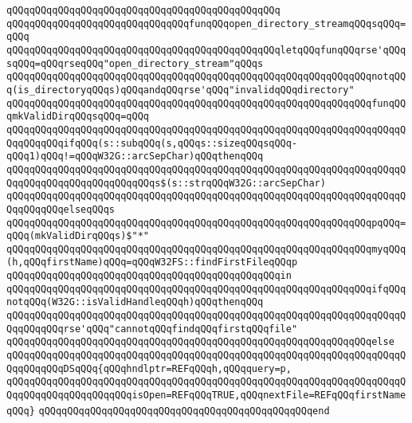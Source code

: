 \verb|qQQqqQQqqQQqqQQqqQQqqQQqqQQqqQQqqQQqqQQqqQQqqQQq|\newline
\verb|qQQqqQQqqQQqqQQqqQQqqQQqqQQqqQQqfunqQQqopen_directory_streamqQQqsqQQq=qQQq|\newline
\verb|qQQqqQQqqQQqqQQqqQQqqQQqqQQqqQQqqQQqqQQqqQQqqQQqletqQQqfunqQQqrse'qQQqsqQQq=qQQqrseqQQq"open_directory_stream"qQQqs|\newline
\verb|qQQqqQQqqQQqqQQqqQQqqQQqqQQqqQQqqQQqqQQqqQQqqQQqqQQqqQQqqQQqqQQqnotqQQq(is_directoryqQQqs)qQQqandqQQqrse'qQQq"invalidqQQqdirectory"|\newline
\verb|qQQqqQQqqQQqqQQqqQQqqQQqqQQqqQQqqQQqqQQqqQQqqQQqqQQqqQQqqQQqqQQqfunqQQqmkValidDirqQQqsqQQq=qQQq|\newline
\verb|qQQqqQQqqQQqqQQqqQQqqQQqqQQqqQQqqQQqqQQqqQQqqQQqqQQqqQQqqQQqqQQqqQQqqQQqqQQqqQQqifqQQq(s::subqQQq(s,qQQqs::sizeqQQqsqQQq-qQQq1)qQQq!=qQQqW32G::arcSepChar)qQQqthenqQQq|\newline
\verb|qQQqqQQqqQQqqQQqqQQqqQQqqQQqqQQqqQQqqQQqqQQqqQQqqQQqqQQqqQQqqQQqqQQqqQQqqQQqqQQqqQQqqQQqqQQqqQQqs$(s::strqQQqW32G::arcSepChar)|\newline
\verb|qQQqqQQqqQQqqQQqqQQqqQQqqQQqqQQqqQQqqQQqqQQqqQQqqQQqqQQqqQQqqQQqqQQqqQQqqQQqqQQqelseqQQqs|\newline
\verb|qQQqqQQqqQQqqQQqqQQqqQQqqQQqqQQqqQQqqQQqqQQqqQQqqQQqqQQqqQQqqQQqpqQQq=qQQq(mkValidDirqQQqs)$"*"|\newline
\verb|qQQqqQQqqQQqqQQqqQQqqQQqqQQqqQQqqQQqqQQqqQQqqQQqqQQqqQQqqQQqqQQqmyqQQq(h,qQQqfirstName)qQQq=qQQqW32FS::findFirstFileqQQqp|\newline
\verb|qQQqqQQqqQQqqQQqqQQqqQQqqQQqqQQqqQQqqQQqqQQqqQQqin|\newline
\verb|qQQqqQQqqQQqqQQqqQQqqQQqqQQqqQQqqQQqqQQqqQQqqQQqqQQqqQQqqQQqqQQqifqQQqnotqQQq(W32G::isValidHandleqQQqh)qQQqthenqQQq|\newline
\verb|qQQqqQQqqQQqqQQqqQQqqQQqqQQqqQQqqQQqqQQqqQQqqQQqqQQqqQQqqQQqqQQqqQQqqQQqqQQqqQQqrse'qQQq"cannotqQQqfindqQQqfirstqQQqfile"|\newline
\verb|qQQqqQQqqQQqqQQqqQQqqQQqqQQqqQQqqQQqqQQqqQQqqQQqqQQqqQQqqQQqqQQqelse|\newline
\verb|qQQqqQQqqQQqqQQqqQQqqQQqqQQqqQQqqQQqqQQqqQQqqQQqqQQqqQQqqQQqqQQqqQQqqQQqqQQqqQQqDSqQQq{qQQqhndlptr=REFqQQqh,qQQqquery=p,|\newline
\verb|qQQqqQQqqQQqqQQqqQQqqQQqqQQqqQQqqQQqqQQqqQQqqQQqqQQqqQQqqQQqqQQqqQQqqQQqqQQqqQQqqQQqqQQqqQQqisOpen=REFqQQqTRUE,qQQqnextFile=REFqQQqfirstNameqQQq}|\newline
\verb|qQQqqQQqqQQqqQQqqQQqqQQqqQQqqQQqqQQqqQQqqQQqqQQqend|\newline
